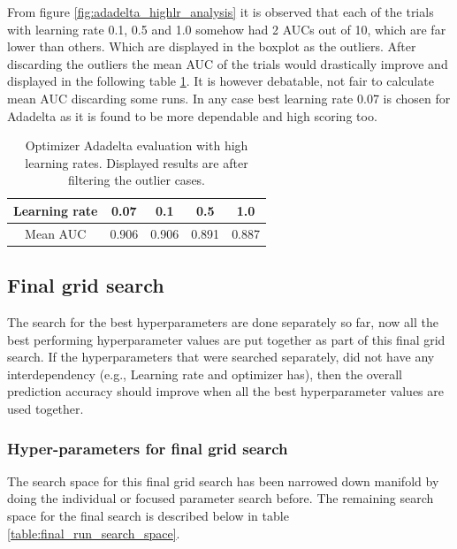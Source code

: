 \flushbottom
\newpage
From figure \ref{fig:adadelta_highlr_analysis} it is observed that each of the trials with learning rate 0.1, 0.5 and 
1.0 somehow had 2 AUCs out of 10, which are far lower than others. Which are displayed in the boxplot as the outliers. After discarding the outliers the mean AUC of the trials would drastically improve and displayed in the following table 
\ref{table:adadelta_high_lr}. It is however debatable, not fair to calculate mean AUC discarding some runs. In any case best learning rate 0.07 is chosen for Adadelta as it is found to be more dependable and high scoring too.

\begin{table}[ht]
 \centering
 \caption{Optimizer Adadelta evaluation with high learning rates. Displayed results are after filtering the outlier cases.}
 \begin{tabular}{|c c c c c|} 
 \hline\hline
 \rowcolor{lightgrey}
 Learning rate & 0.07 & 0.1 & 0.5 & 1.0 \\ [0.5ex] 
 \hline
 Mean AUC & 0.906 & 0.906 & 0.891 & 0.887 \\ 
 \hline \hline
\end{tabular}
\label{table:adadelta_high_lr}
\end{table}


\subsection{Final grid search}
The search for the best hyperparameters are done separately so far, now all the best performing hyperparameter values are put together as part of this final grid search. If the hyperparameters that were searched separately, did 
not have any interdependency (e.g., Learning rate and optimizer has), then the overall prediction accuracy should improve when all the best hyperparameter values are used together. 

\subsubsection{Hyper-parameters for final grid search}
The search space for this final grid search has been narrowed 
down manifold by doing the individual or focused parameter search before. The remaining search space for the final search is described below in table \ref{table:final_run_search_space}.

